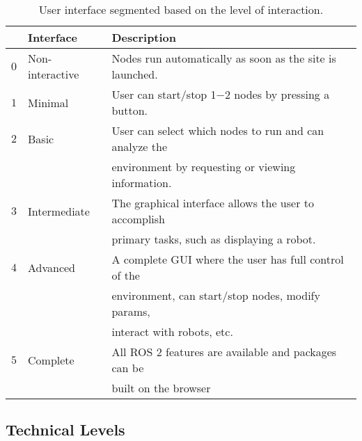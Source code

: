         \begin{table}[htbp]
            \color{textColor}
            \centering	
            \caption{User interface segmented based on the level of interaction.}
                \begin{tabular}{rll}
                    \toprule
                    & \textbf{Interface} & \textbf{Description} \\
                    \midrule
                    $0$ & Non-interactive & Nodes run automatically as soon as the site is launched. \\ [0.5em]

                    $1$ & Minimal         & User can start/stop 1$-$2 nodes by pressing a button. \\[0.5em]

                    $2$ & Basic           & User can select which nodes to run and can analyze the \\
                    & & environment by requesting or viewing information. \\[0.5em]

                    $3$ & Intermediate    & The graphical interface allows the user to accomplish \\
                    & & primary tasks, such as displaying a robot. \\[0.5em]

                    $4$ & Advanced        & A complete GUI where the user has full control of the \\
                    & & environment, can start/stop nodes, modify params, \\
                    & & interact with robots, etc. \\[0.5em]

                    $5$ & Complete        & All ROS 2 features are available and packages can be \\
                    & & built on the browser \\

                \bottomrule
            \end{tabular}\label{tab:uilevels}
        \end{table}

    \subsection{Technical Levels}

